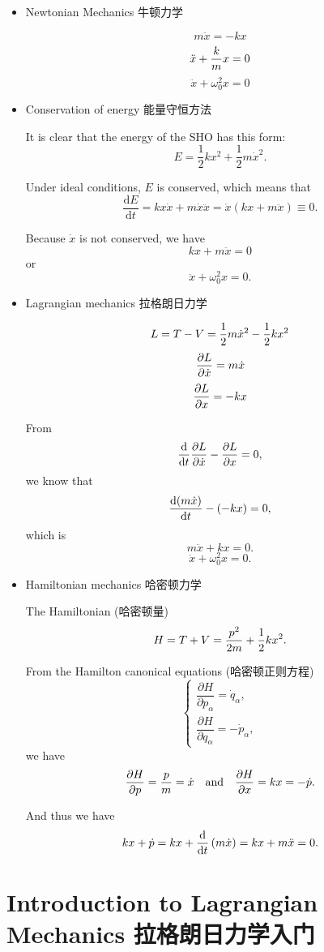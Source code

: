 \begin{itemize}
\tightlist{}
\item
  Newtonian Mechanics 牛顿力学

  \[m \ddot x = -kx\] \[\ddot x + {k \over m } x =0 \] \[\ddot x + \omega_0^2 x =0\]

\item
  Conservation of energy 能量守恒方法

  It is clear that the energy of the SHO has this form:
  \[E = \dfrac{1}{2}kx^2 + \dfrac{1}{2} m \dot{x}^2.\]

  Under ideal conditions, \(E\) is conserved, which means that
  \[\dfrac{\mathrm{d} E}{\mathrm{d} t} = kx \dot{x} + m \dot{x} \ddot{x} = \dot{x} \left( kx + m \ddot{x} \right) \equiv 0.\]

  Because \(\dot{x}\) is not conserved, we have \[kx + m \ddot{x} = 0\]
  or \[\ddot x + \omega_0^2 x =0.\]
\item
  Lagrangian mechanics 拉格朗日力学

  \[L=T-V = {1 \over 2}m \dot x^2-{1 \over 2}k x^2\] \[{\partial L \over \partial \dot x} = m \dot x\] \[{\partial L \over \partial x} = -kx\]

  From
  \[{\mathrm d \over \mathrm dt} {\partial L \over \partial \dot x}- {\partial L \over \partial x}=0,\]
  we know that
  \[{\mathrm d(m \dot x) \over \mathrm dt} - (-kx)=0, \]which is
  \[m \ddot x +kx = 0.\] \[\ddot x + \omega_0^2 x =0.\]
\item
  Hamiltonian mechanics 哈密顿力学

  The Hamiltonian (哈密顿量)
  \[H = T + V = {p^2 \over 2m} + {1 \over 2} kx^2.\]

  From the Hamilton canonical equations (哈密顿正则方程) \[\left\{
    \begin{array} {l}
    \dfrac{\partial H}{\partial p_\alpha} = \dot q_\alpha, \\[2ex]
    \dfrac{\partial H}{\partial q_\alpha} = - \dot p_\alpha,
    \end{array}
    \right.\] we have
  \[\dfrac{\partial H}{\partial p} = {p \over m} = \dot{x} \quad \text{and} \quad \dfrac{\partial H}{\partial x} = kx = - \dot{p}.\]

  And thus we have
  \[kx + \dot{p} = kx + {\mathrm{d} \over \mathrm{d}t}\left( m \dot{x} \right) = kx + m \ddot{x} = 0.\]
\end{itemize}

\section{Introduction to Lagrangian Mechanics
拉格朗日力学入门}\label{introduction-to-lagrangian-mechanics-ux62c9ux683cux6717ux65e5ux529bux5b66ux5165ux95e8}

